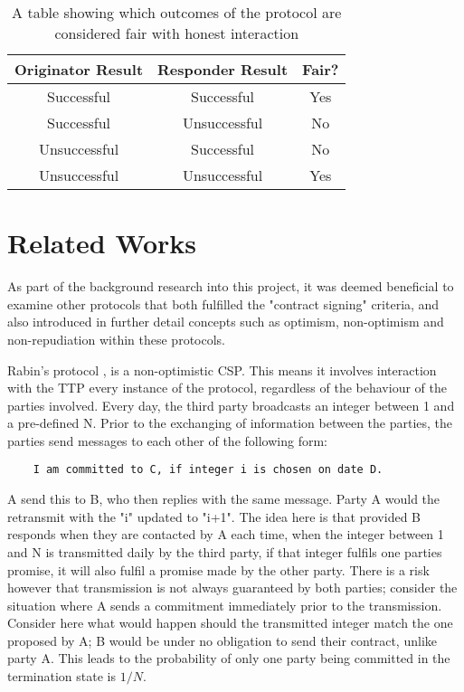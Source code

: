 \documentclass{l4proj}
\begin{document}
\begin{table}[]
\centering
\begin{tabular}{c|c || c}
 Originator Result & Responder Result & Fair?  \\
 \hline
 Successful & Successful & Yes \\
  Successful & Unsuccessful & No \\
    Unsuccessful & Successful & No \\
      Unsuccessful & Unsuccessful & Yes
 
\end{tabular}
\caption{A table showing which outcomes of the protocol are considered fair with honest interaction}
\label{fair}
\end{table}

\section{Related Works}

As part of the background research into this project, it was deemed beneficial to examine other protocols that both fulfilled the "contract signing" criteria, and also introduced in further detail concepts such as optimism, non-optimism and non-repudiation within these protocols.

Rabin's protocol \cite{rabin1983transaction}, is a non-optimistic CSP. This means it involves interaction with the TTP every instance of the protocol, regardless of the behaviour of the parties involved. Every day, the third party broadcasts an integer between 1 and a pre-defined N. Prior to the exchanging of information between the parties, the parties send messages to each other of the following form:
\begin{lstlisting}
    I am committed to C, if integer i is chosen on date D.
\end{lstlisting}
A send this to B, who then replies with the same message. Party A would the retransmit with the "i" updated to "i+1". The idea here is that provided B responds when they are contacted by A each time, when the integer between 1 and N is transmitted daily by the third party, if that integer fulfils one parties promise, it will also fulfil a promise made by the other party. There is a risk however that transmission is not always guaranteed by both parties; consider the situation where A sends a commitment immediately prior to the transmission. Consider here what would happen should the transmitted integer match the one proposed by A; B would be under no obligation to send their contract, unlike party A. This leads to the probability of only one party being committed in the termination state is $1/N$.
\end{document}
